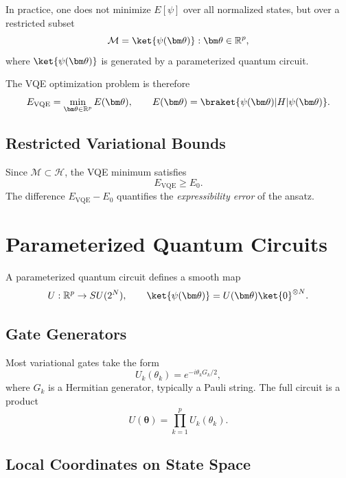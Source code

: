\documentclass{book}
\begin{document}
In practice, one does not minimize $E[\psi]$ over all normalized states, but over a restricted subset
\begin{equation}
\mathcal{M} = {\ket{\psi(\bm\theta)} : \bm\theta \in \mathbb{R}^p},
\end{equation}
where $\ket{\psi(\bm\theta)}$ is generated by a parameterized quantum circuit.

The VQE optimization problem is therefore
\begin{equation}
E_\mathrm{VQE} = \min_{\bm\theta \in \mathbb{R}^p} E(\bm\theta), \qquad E(\bm\theta) = \braket{\psi(\bm\theta)|H|\psi(\bm\theta)}.
\end{equation}

\subsection{Restricted Variational Bounds}

Since $\mathcal{M} \subset \mathcal{H}$, the VQE minimum satisfies
\begin{equation}
E_\mathrm{VQE} \ge E_0.
\end{equation}
The difference $E_\mathrm{VQE} - E_0$ quantifies the \emph{expressibility error} of the ansatz.

\section{Parameterized Quantum Circuits}

A parameterized quantum circuit defines a smooth map
\begin{equation}
U : \mathbb{R}^p \to SU(2^N), \qquad \ket{\psi(\bm\theta)} = U(\bm\theta)\ket{0}^{\otimes N}.
\end{equation}

\subsection{Gate Generators}

Most variational gates take the form
\begin{equation}
U_k(\theta_k) = e^{-i \theta_k G_k / 2},
\end{equation}
where $G_k$ is a Hermitian generator, typically a Pauli string. The full circuit is a product
\begin{equation}
U(\bm\theta) = \prod_{k=1}^p U_k(\theta_k).
\end{equation}

\subsection{Local Coordinates on State Space}
\end{document}
